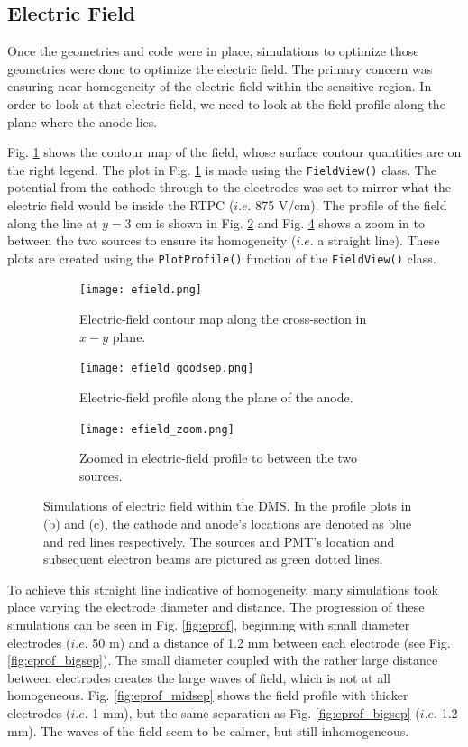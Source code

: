 \subsection{Electric Field}
Once the geometries and code were in place, simulations to optimize those geometries were done to optimize the electric field. The primary concern was ensuring near-homogeneity of the electric field within the sensitive region. In order to look at that electric field, we need to look at the field profile along the plane where the anode lies. 

Fig. \ref{fig:e_map} shows the contour map of the field, whose surface contour quantities are on the right legend. The plot in Fig. \ref{fig:e_map} is made using the \lstinline|FieldView()| class. The potential from the cathode through to the electrodes was set to mirror what the electric field would be inside the RTPC ($i.e.$ 875 V/cm). The profile of the field along the line at $y=3$ cm is shown in Fig. \ref{fig:eprof_good} and Fig. \ref{fig:eprof_goodzoom} shows a zoom in to between the two sources to ensure its homogeneity ($i.e.$ a straight line). These plots are created using the \lstinline|PlotProfile()| function of the \lstinline|FieldView()| class.

\begin{figure}[h!]
	\centering
	\begin{subfigure}[b]{0.33\textwidth}
		\texttt{[image: efield.png]}
		\caption{Electric-field contour map along the cross-section in $x-y$ plane.}
		\label{fig:e_map}
	\end{subfigure}
	\begin{subfigure}[b]{0.3\textwidth}
		\texttt{[image: efield\_goodsep.png]}
		\caption{Electric-field profile along the plane of the anode.}
		\label{fig:eprof_good}
	\end{subfigure}
	\begin{subfigure}[b]{0.33\textwidth}
		\texttt{[image: efield\_zoom.png]}
		\caption{Zoomed in electric-field profile to between the two sources.}
		\label{fig:eprof_goodzoom}
	\end{subfigure}
	\caption{Simulations of electric field within the DMS. In the profile plots in (b) and (c), the cathode and anode's locations are denoted as blue and red lines respectively. The sources and PMT's location and subsequent electron beams are pictured as green dotted lines.}
\end{figure}

To achieve this straight line indicative of homogeneity, many simulations took place varying the electrode diameter and distance. The progression of these simulations can be seen in Fig. \ref{fig:eprof}, beginning with small diameter electrodes ($i.e.$ 50 \textmu m) and a distance of 1.2 mm between each electrode (see Fig. \ref{fig:eprof_bigsep}). The small diameter coupled with the rather large distance between electrodes creates the large waves of field, which is not at all homogeneous. Fig. \ref{fig:eprof_midsep} shows the field profile with thicker electrodes ($i.e.$ 1 mm), but the same separation as Fig. \ref{fig:eprof_bigsep} ($i.e.$ 1.2 mm). The waves of the field seem to be calmer, but still inhomogeneous.

